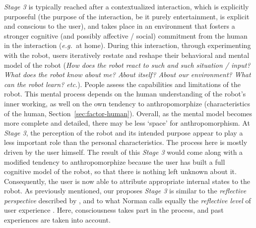 \documentclass{frontiersSCNS} %
\newcommand{\eg}{{\textit{e.g.~}}}
\begin{document}
\textit{Stage 3} is typically reached after a contextualized interaction, which is explicitly purposeful (the purpose of the interaction, be it purely entertainment, is explicit and conscious to the user), and takes place in an environment that fosters a stronger cognitive (and possibly affective / social) commitment from the human in the interaction (\eg at home). During this interaction, through experimenting with the robot, users iteratively restate  and reshape their behavioral and mental model of the robot (\textit{How does the robot react to such and such situation / input? What does the robot know about me? About itself? About our environment? What can the robot learn? etc.}). People assess the capabilities and limitations of the robot. This mental process depends on the human understanding of the robot's inner working, as well on the own tendency to anthropomorphize (characteristics of the human, Section~\ref{sec:factor-human}). Overall, as the mental model becomes more complete and detailed, there may be less `space' for anthropomorphism. At \textit{Stage 3}, the perception of the robot and its intended purpose appear to play a less important role than the personal characteristics. The process here is mostly driven by the user himself. The result of this \textit{Stage 3} would come along with a modified tendency to anthropomorphize because the user has built a full cognitive model of the robot, so that there is nothing left unknown about it. Consequently, the user is now able to attribute appropriate internal states to the robot. 
As previously mentioned, our proposes \textit{Stage 3} is similar to the \textit{reflective perspective} described by \cite{takayama_perspectives_2012}, and to what Norman calls equally the \textit{reflective level} of user experience \citep{norman_emotional_2003}. Here, consciousness takes part in the process, and past experiences are taken into account. 

%
\end{document}
